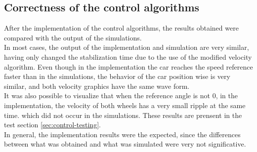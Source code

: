\subsection{Correctness of the control algorithms}
After the implementation of the control algorithms, the results obtained were compared with the output of the simulations.\\
In most cases, the output of the implementation and simulation are very similar, having only changed the stabilization time due to the use of the modified velocity algorithm. Even though in the implementation the car reaches the speed reference faster than in the simulations, the behavior of the car position wise is very similar, and both velocity graphics have the same wave form.\\
It was also possible to visualize that when the reference angle is not 0, in the implementation, the velocity of both wheels has a very small ripple at the same time. which did not occur in the simulations. These results are prensent in the test section \ref{sec:control-testing}.\\
In general, the implementation results were the expected, since the differences between what was obtained and what was simulated were very not significative.\\